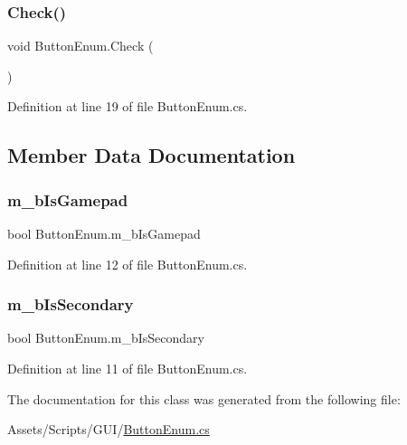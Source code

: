 \subsubsection{\texorpdfstring{Check()}{Check()}}
{\footnotesize\ttfamily void Button\+Enum.\+Check (\begin{DoxyParamCaption}{ }\end{DoxyParamCaption})}



Definition at line 19 of file Button\+Enum.\+cs.



\subsection{Member Data Documentation}
\mbox{\label{class_button_enum_aff6d2a6526780ba222f4ac2aebbc7af0}} 
\subsubsection{\texorpdfstring{m\+\_\+b\+Is\+Gamepad}{m\_bIsGamepad}}
{\footnotesize\ttfamily bool Button\+Enum.\+m\+\_\+b\+Is\+Gamepad}



Definition at line 12 of file Button\+Enum.\+cs.

\mbox{\label{class_button_enum_affdb4fb80373e8ae1c344afc4c37a3f3}} 
\subsubsection{\texorpdfstring{m\+\_\+b\+Is\+Secondary}{m\_bIsSecondary}}
{\footnotesize\ttfamily bool Button\+Enum.\+m\+\_\+b\+Is\+Secondary}



Definition at line 11 of file Button\+Enum.\+cs.



The documentation for this class was generated from the following file\+:\begin{DoxyCompactItemize}
\item 
Assets/\+Scripts/\+G\+U\+I/\mbox{\hyperlink{_button_enum_8cs}{Button\+Enum.\+cs}}\end{DoxyCompactItemize}
